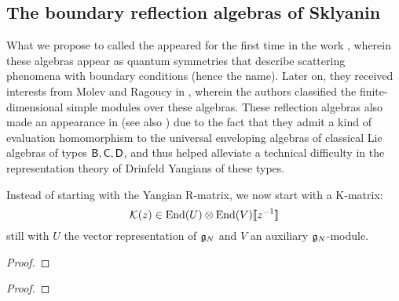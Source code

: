     \subsection{The boundary reflection algebras of Sklyanin}
        What we propose to called the  appeared for the first time in the work \cite{sklyanin_boundary_conditions_for_integrable_quantum_systems}, wherein these algebras appear as quantum symmetries that describe scattering phenomena with boundary conditions (hence the name). Later on, they received interests from Molev and Ragoucy in \cite{molev_ragoucy_representations_of_reflection_algebras}, wherein the authors classified the finite-dimensional simple modules over these algebras. These reflection algebras also made an appearance in \cite{isaev_molev_ogievetsky_fusion_for_brauer_algebras_2} (see also \cite{isaev_molev_fusion_for_brauer_algebras_1}) due to the fact that they admit a kind of evaluation homomorphism to the universal enveloping algebras of classical Lie algebras of types $\mathsf{B}, \mathsf{C}, \mathsf{D}$, and thus helped alleviate a technical difficulty in the representation theory of Drinfeld Yangians of these types.

        Instead of starting with the Yangian R-matrix, we now start with a K-matrix:
            $$\calK(z) \in \End(U) \tensor \End(V)[\![z^{-1}]\!]$$
        still with $U$ the vector representation of $\mathfrak{g}_N$ and $V$ an auxiliary $\mathfrak{g}_N$-module.

        \begin{definition} \label{def: boundary_reflection_algebras}
            
        \end{definition}

        \begin{lemma} \label{lemma: embedding_boundary_reflection_algebras_into_extended_yangians}
            
        \end{lemma}
            \begin{proof}
                
            \end{proof}
        \begin{theorem} \label{theorem: evaluation_homomorphism_for_scattering_reflection_algebras}
            
        \end{theorem}
            \begin{proof}
                
            \end{proof}

